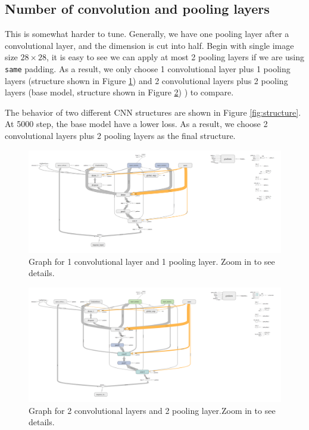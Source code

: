 \documentclass[11pt]{article}
\begin{document}
\clearpage
\subsection{Number of convolution and pooling layers}
This is somewhat harder to tune. Generally, we have one pooling layer after a convolutional layer, and the dimension is cut into half. Begin with single image size $28\times 28$, it is easy to see we can apply at most 2 pooling layers if we are using {\tt same} padding. As a result, we only choose 1 convolutional layer plus 1 pooling layers (structure shown in Figure \ref{fig:1-c-1-p}) and 2 convolutional layers plus 2 pooling layers (base model,  structure shown in Figure \ref{fig:2-c-2-p}) ) to compare.

The behavior of two different CNN structures are shown in Figure \ref{fig:structure}. At 5000 step, the base model have a lower loss. As a result, we choose 2 convolutional layers plus 2 pooling layers as the final structure.


\begin{figure}[!htb]
   \centering
   \includegraphics[width=16cm]{images/graph-conv1-pool1.png} %
   \caption{Graph for 1 convolutional layer and 1 pooling layer. Zoom in to see details.}
   \label{fig:1-c-1-p}
\end{figure}


\begin{figure}[!htb]
   \centering
   \includegraphics[width=16cm]{images/graph-conv2-pool2.png} %
   \caption{Graph for 2 convolutional layers and 2 pooling layer.Zoom in to see details.}
   \label{fig:2-c-2-p}
\end{figure}
\end{document}
